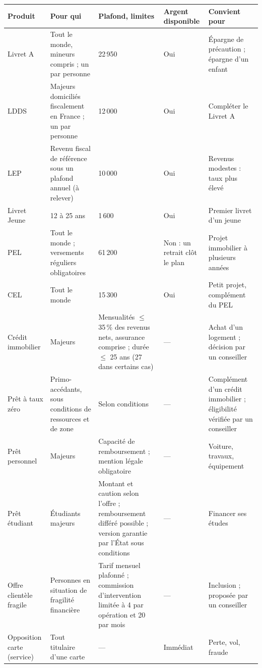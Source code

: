 \begin{center}\small
\begin{longtable}{@{}L{2.5cm} L{3.1cm} L{2.6cm} L{2.2cm} L{3.7cm}@{}}
\toprule
\textbf{Produit} & \textbf{Pour qui} & \textbf{Plafond, limites} & \textbf{Argent disponible}
  & \textbf{Convient pour} \\
\midrule
\endhead
Livret A & Tout le monde, mineurs compris ; un par personne & 22\,950\eur{} & Oui & Épargne de
  précaution ; épargne d'un enfant \\
LDDS & Majeurs domiciliés fiscalement en France ; un par personne & 12\,000\eur{} & Oui &
  Compléter le Livret A \\
LEP & Revenu fiscal de référence sous un plafond annuel (à relever) & 10\,000\eur{} & Oui &
  Revenus modestes : taux plus élevé \\
Livret Jeune & 12 à 25 ans & 1\,600\eur{} & Oui & Premier livret d'un jeune \\
PEL & Tout le monde ; versements réguliers obligatoires & 61\,200\eur{} & Non : un retrait clôt le
  plan & Projet immobilier à plusieurs années \\
CEL & Tout le monde & 15\,300\eur{} & Oui & Petit projet, complément du PEL \\
\midrule
Crédit immobilier & Majeurs & Mensualités $\leq$ 35\,\% des revenus nets, assurance comprise ;
  durée $\leq$ 25 ans (27 dans certains cas) & --- & Achat d'un logement ; décision par un
  conseiller \\
Prêt à taux zéro & Primo-accédants, sous conditions de ressources et de zone & Selon conditions
  & --- & Complément d'un crédit immobilier ; éligibilité vérifiée par un conseiller \\
Prêt personnel & Majeurs & Capacité de remboursement ; mention légale obligatoire & --- & Voiture,
  travaux, équipement \\
Prêt étudiant & Étudiants majeurs & Montant et caution selon l'offre ; remboursement différé
  possible ; version garantie par l'État sous conditions & --- & Financer ses études \\
\midrule
Offre clientèle fragile & Personnes en situation de fragilité financière & Tarif mensuel plafonné ;
  commission d'intervention limitée à 4\eur{} par opération et 20\eur{} par mois & --- &
  Inclusion ; proposée par un conseiller \\
Opposition carte (service) & Tout titulaire d'une carte & --- & Immédiat & Perte, vol, fraude \\
\bottomrule
\end{longtable}
\end{center}

